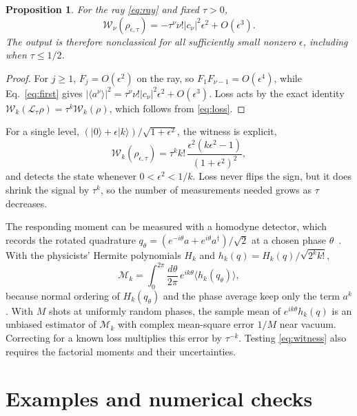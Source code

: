 \documentclass[11pt,a4paper]{article}
\newcommand{\ket}[1]{|#1\rangle}
\newcommand{\ev}[1]{\langle#1\rangle}
\newcommand{\M}{\mathcal M}
\newcommand{\loss}{\mathcal L}
\newtheorem{proposition}{Proposition}
\begin{document}
\begin{proposition}
For the ray \eqref{eq:ray} and fixed $\tau>0$,
\begin{equation}
 \mathcal W_\nu(\rho_{\epsilon,\tau})
 =-\tau^\nu\nu!|c_\nu|^2\epsilon^2+O(\epsilon^3).
 \label{eq:witnessray}
\end{equation}
The output is therefore nonclassical for all sufficiently small nonzero $\epsilon$, including when $\tau\le1/2$.
\end{proposition}
\begin{proof}
For $j\ge1$, $F_j=O(\epsilon^2)$ on the ray, so $F_1F_{\nu-1}=O(\epsilon^4)$, while Eq.~\eqref{eq:first} gives $|\ev{a^\nu}|^2=\tau^\nu\nu!|c_\nu|^2\epsilon^2+O(\epsilon^3)$. Loss acts by the exact identity $\mathcal W_k(\loss_\tau\rho)=\tau^k\mathcal W_k(\rho)$, which follows from \eqref{eq:loss}.
\end{proof}

For a single level, $(\ket0+\epsilon\ket k)/\sqrt{1+\epsilon^2}$, the witness is explicit,
\begin{equation}
 \mathcal W_k(\rho_{\epsilon,\tau})
 =\tau^k k!\,\frac{\epsilon^2(k\epsilon^2-1)}{(1+\epsilon^2)^2},
 \label{eq:seedwitness}
\end{equation}
and detects the state whenever $0<\epsilon^2<1/k$. Loss never flips the sign, but it does shrink the signal by $\tau^k$, so the number of measurements needed grows as $\tau$ decreases.

The responding moment can be measured with a homodyne detector, which records the rotated quadrature $q_\theta=(e^{-i\theta}a+e^{i\theta}a^\dagger)/\sqrt2$ at a chosen phase $\theta$~\cite{richter1996correlation}. With the physicists' Hermite polynomials $H_k$ and $h_k(q)=H_k(q)/\sqrt{2^k k!}$,
\begin{equation}
 \M_k=\int_0^{2\pi}\frac{d\theta}{2\pi}\,
 e^{ik\theta}\ev{h_k(q_\theta)},
 \label{eq:homodyne}
\end{equation}
because normal ordering of $H_k(q_\theta)$ and the phase average keep only the term $a^k$. With $M$ shots at uniformly random phases, the sample mean of $e^{ik\theta}h_k(q)$ is an unbiased estimator of $\M_k$ with complex mean-square error $1/M$ near vacuum. Correcting for a known loss multiplies this error by $\tau^{-k}$. Testing \eqref{eq:witness} also requires the factorial moments and their uncertainties.

\section{Examples and numerical checks}
\label{sec:numerics}
\end{document}
